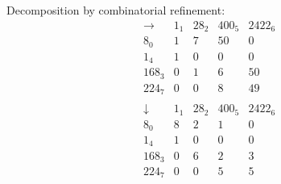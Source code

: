 Decomposition by combinatorial refinement:\\
$$
\begin{array}{r|*{4}{r}}
\rightarrow  &      1_{  1} &     28_{  2} &    400_{  5} &   2422_{  6}\\
\hline
     8_{  0} &            1 &            7 &           50 &            0\\
     1_{  4} &            1 &            0 &            0 &            0\\
   168_{  3} &            0 &            1 &            6 &           50\\
   224_{  7} &            0 &            0 &            8 &           49\\
\end{array}
$$
$$
\begin{array}{r|*{4}{r}}
\downarrow  &      1_{  1} &     28_{  2} &    400_{  5} &   2422_{  6}\\
\hline
     8_{  0} &            8 &            2 &            1 &            0\\
     1_{  4} &            1 &            0 &            0 &            0\\
   168_{  3} &            0 &            6 &            2 &            3\\
   224_{  7} &            0 &            0 &            5 &            5\\
\end{array}
$$
